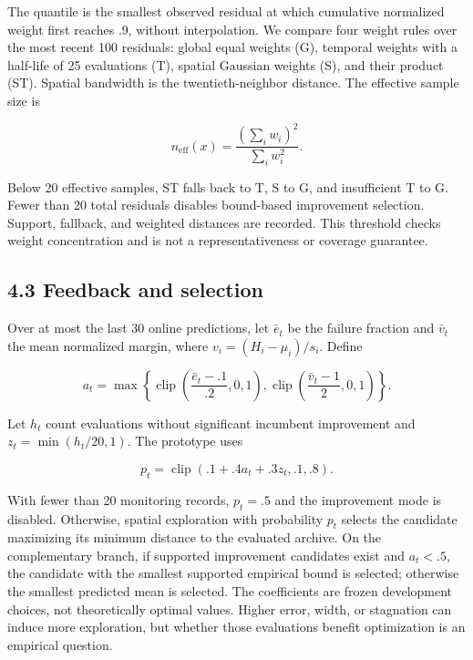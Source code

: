 \documentclass[11pt,a4paper]{article}
\begin{document}
The quantile is the smallest observed residual at which cumulative
normalized weight first reaches .9, without interpolation. We compare
four weight rules over the most recent 100 residuals: global equal
weights (G), temporal weights with a half-life of 25 evaluations (T),
spatial Gaussian weights (S), and their product (ST). Spatial bandwidth
is the twentieth-neighbor distance. The effective sample size is

\[n_{\mathrm{eff}}(x)=\frac{(\sum_iw_i)^2}{\sum_iw_i^2}.\]

Below 20 effective samples, ST falls back to T, S to G, and insufficient
T to G. Fewer than 20 total residuals disables bound-based improvement
selection. Support, fallback, and weighted distances are recorded. This
threshold checks weight concentration and is not a representativeness or
coverage guarantee.

\begin{samepage}

\hypertarget{feedback-and-selection}{%
\subsection{4.3 Feedback and selection}\label{feedback-and-selection}}

Over at most the last 30 online predictions, let \(\bar e_t\) be the
failure fraction and \(\bar v_t\) the mean normalized margin, where
\(v_i=(H_i-\mu_i)/s_i\). Define

\[a_t=\max\left\{\operatorname{clip}\left(\frac{\bar e_t-.1}{.2},0,1\right),\operatorname{clip}\left(\frac{\bar v_t-1}{2},0,1\right)\right\}.\]

\end{samepage}

Let \(h_t\) count evaluations without significant incumbent improvement
and \(z_t=\min(h_t/20,1)\). The prototype uses

\[p_t=\operatorname{clip}(.1+.4a_t+.3z_t,.1,.8).\]

With fewer than 20 monitoring records, \(p_t=.5\) and the improvement
mode is disabled. Otherwise, spatial exploration with probability
\(p_t\) selects the candidate maximizing its minimum distance to the
evaluated archive. On the complementary branch, if supported improvement
candidates exist and \(a_t<.5\), the candidate with the smallest
supported empirical bound is selected; otherwise the smallest predicted
mean is selected. The coefficients are frozen development choices, not
theoretically optimal values. Higher error, width, or stagnation can
induce more exploration, but whether those evaluations benefit
optimization is an empirical question.
\end{document}
